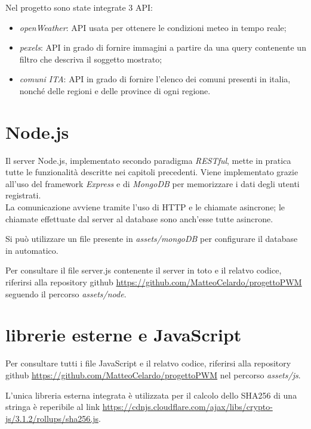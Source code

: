 Nel progetto sono state integrate 3 API:
\begin{itemize}
    \item \emph{openWeather}: API usata per ottenere le condizioni meteo in tempo reale;
    \item \emph{pexels}: API in grado di fornire immagini a partire da una query contenente un filtro che descriva il soggetto mostrato;
    \item \emph{comuni ITA}: API in grado di fornire l'elenco dei comuni presenti in italia, nonché delle regioni e delle province di ogni regione.
\end{itemize}

\section{Node.js}

Il server Node.js, implementato secondo paradigma \emph{RESTful}, mette in pratica tutte le funzionalità descritte nei capitoli precedenti. Viene implementato 
grazie all'uso del framework \emph{Express} e di \emph{MongoDB} per memorizzare i dati degli utenti registrati.\\
La comunicazione avviene tramite l'uso di HTTP e le chiamate asincrone; le chiamate effettuate dal server al database sono anch'esse tutte asincrone.

\vspace{5mm}

Si può utilizzare un file presente in \emph{assets/mongoDB} per configurare il database in automatico.

\vspace{5mm}

Per consultare il file server.js contenente il server in toto e il relatvo codice, 
riferirsi alla repository github \url{https://github.com/MatteoCelardo/progettoPWM} seguendo il percorso \emph{assets/node}.


\section{librerie esterne e JavaScript}

Per consultare tutti i file JavaScript e il relatvo codice, riferirsi alla repository github \url{https://github.com/MatteoCelardo/progettoPWM} 
nel percorso \emph{assets/js}.

L'unica libreria esterna integrata è utilizzata per il calcolo dello SHA256 di una stringa è reperibile al link \url{https://cdnjs.cloudflare.com/ajax/libs/crypto-js/3.1.2/rollups/sha256.js}.